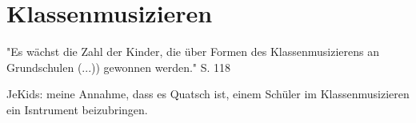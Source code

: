 \section{Klassenmusizieren}


"Es wächst die Zahl der Kinder, die über Formen des Klassenmusizierens an
Grundschulen (...)) gewonnen werden." S. 118 

JeKids: meine Annahme, dass es Quatsch ist, einem Schüler im Klassenmusizieren
ein Isntrument beizubringen.
